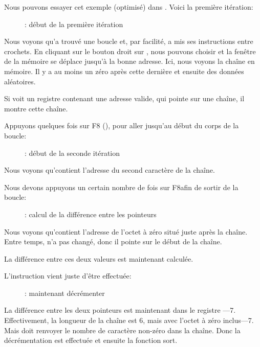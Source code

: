 ﻿\clearpage
{}
\myindex{\olly}

Nous pouvons essayer cet exemple (optimisé) dans \olly. Voici la première itération:

\begin{figure}[H]
\centering
{}
\caption{\olly: début de la première itération}
\label{fig:strlen_olly_1}
\end{figure}

Nous voyons qu'\olly a trouvé une boucle et, par facilité, a mis ses instructions
entre crochets.
En cliquant sur le bouton droit sur \EAX, nous pouvons choisir 
et la fenêtre de la mémoire se déplace jusqu'à la bonne adresse.
Ici, nous voyons la chaîne  en mémoire.
Il y a au moins un zéro après cette dernière et ensuite des données aléatoires.

Si \olly voit un registre contenant une adresse valide, qui pointe sur une chaîne,
il montre cette chaîne.

\clearpage
Appuyons quelques fois sur F8 (\stepover), pour aller jusqu'au début du corps de
la boucle:

\begin{figure}[H]
\centering
{}
\caption{\olly: début de la seconde itération}
\label{fig:strlen_olly_2}
\end{figure}

Nous voyons qu'\EAX contient l'adresse du second caractère de la chaîne.

\clearpage

Nous devons appuyons un certain nombre de fois sur F8afin de sortir de la boucle:

\begin{figure}[H]
\centering
{}
\caption{\olly: calcul de la différence entre les pointeurs}
\label{fig:strlen_olly_3}
\end{figure}

Nous voyons qu'\EAX contient l'adresse de l'octet à zéro situé juste après la chaîne.
Entre temps, \EDX n'a pas changé, donc il pointe sur le début de la chaîne.

La différence entre ces deux valeurs est maintenant calculée.

\clearpage
L'instruction \SUB vient juste d'être effectuée:

\begin{figure}[H]
\centering
{}
\caption{\olly: maintenant décrémenter \EAX}
\label{fig:strlen_olly_4}
\end{figure}

La différence entre les deux pointeurs est maintenant dans le registre \EAX---7.
Effectivement, la longueur de la chaîne  est 6, mais avec l'octet à zéro
inclus---7.
Mais  doit renvoyer le nombre de caractère non-zéro dans la chaîne.
Donc la décrémentation est effectuée et ensuite la fonction sort.
